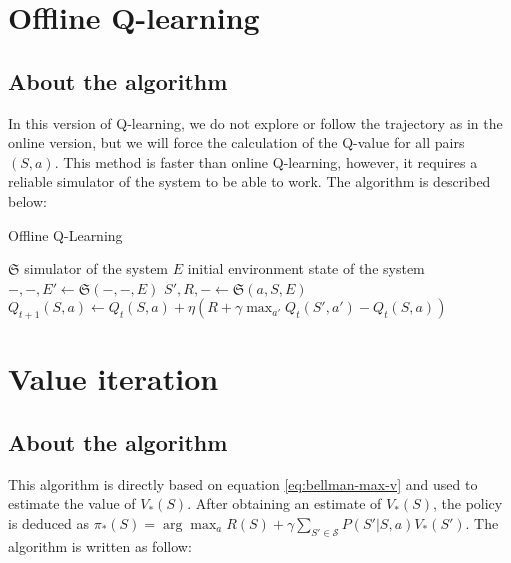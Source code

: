 \documentclass[
  a4paper, xcolor = usenames,dvipsnames]{article}
\theoremstyle{definition}
\theoremstyle{definition}
\theoremstyle{definition}
\theoremstyle{definition}
\theoremstyle{remark}
\begin{document}
\hypertarget{offline-q-learning}{%
\section{Offline Q-learning}\label{offline-q-learning}}

\hypertarget{about-the-algorithm-1}{%
\subsection{About the algorithm}\label{about-the-algorithm-1}}

In this version of Q-learning, we do not explore or follow the trajectory as in the online version, but we will force the calculation of the Q-value for all pairs \((S, a)\). This method is faster than online Q-learning, however, it requires a reliable simulator of the system to be able to work. The algorithm is described below:

\begin{algorithm}
\caption{Offline Q-Learning}\label{alg:off-q-learning}
$\mathfrak{S}$ simulator of the system\;
$E$ initial environment state of the system\;
 {
  $ -, -, E' \gets \mathfrak{S}(-, -, E)$\;
   {
     {
      $S', R, - \gets \mathfrak{S}(a, S, E)$\;
      $Q_{t+1}(S, a) \gets Q_{t}(S, a) + \eta (R + \gamma \max_{a'} Q_{t}(S', a') - Q_{t}(S, a))$\;
    }
  }
}
\end{algorithm}

\hypertarget{value-iteration}{%
\section{Value iteration}\label{value-iteration}}

\hypertarget{about-the-algorithm-2}{%
\subsection{About the algorithm}\label{about-the-algorithm-2}}

This algorithm is directly based on equation \eqref{eq:bellman-max-v} and used to estimate the value of \(V_{*}(S)\). After obtaining an estimate of \(V_{*}(S)\), the policy is deduced as \(\pi_{*}(S) = \arg\max_{a} R(S) + \gamma \sum_{S' \in \mathcal{S}} P(S' | S, a) V_{*}(S')\). The algorithm is written as follow:
\end{document}
